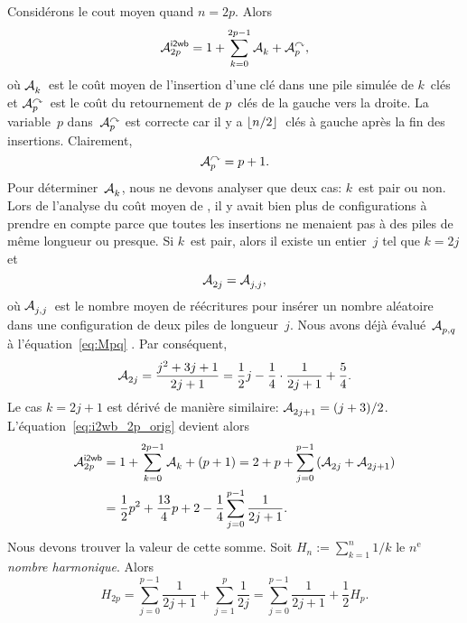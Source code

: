Considérons le cout moyen quand \(n=2p\). Alors
\begin{equation}
  \M{\fun{i2wb}}{2p} = 1 + \sum_{k=0}^{2p-1}{\M{}{k}} + \M{\curvearrowright}{p},
  \label{eq:i2wb_2p_orig}
\end{equation}
où \(\mathcal{A}_{k}^{}\)~est le coût moyen de l'insertion d'une clé dans une
pile simulée de \(k\)~clés et
\(\mathcal{A}_{p}^{\curvearrowright}\)~est
le coût du retournement de \(p\)~clés de la gauche vers la droite. La
variable~\(p\) dans~\(\mathcal{A}_{p}^{\curvearrowright}\) est correcte car il y
a \(\lfloor{n/2}\rfloor\)~clés à gauche après la fin des
insertions. Clairement,
\begin{equation*}
\mathcal{A}_{p}^{\curvearrowright} = p + 1.
\end{equation*}
Pour déterminer~\(\mathcal{A}_{k}^{}\), nous ne devons analyser que deux cas:
\(k\)~est pair ou non. Lors de l'analyse du coût moyen de ,
il y avait bien plus de configurations à prendre en compte parce que
toutes les insertions ne menaient pas à des piles de même longueur ou
presque. Si \(k\)~est pair, alors il existe un entier~\(j\) tel que
\(k=2j\) et
\begin{equation*}
\mathcal{A}_{2j}^{} = \mathcal{A}_{j,j}^{},
\end{equation*}
où \(\mathcal{A}_{j,j}^{}\)~est le nombre moyen de réécritures pour insérer un
nombre aléatoire dans une configuration de deux piles de
longueur~\(j\). Nous avons déjà évalué~\(\mathcal{A}_{p,q}^{}\) à
l'équation~\eqref{eq:Mpq} . Par conséquent,
\begin{equation*}
\mathcal{A}_{2j}^{} = \frac{j^2 + 3j + 1}{2j+1}
         = \frac{1}{2}{j} - \frac{1}{4} \cdot \frac{1}{2j+1} +
         \frac{5}{4}.
\end{equation*}
Le cas \(k=2j+1\) est dérivé de manière similaire: \(\mathcal{A}_{2j+1}^{} =
(j+3)/2\). L'équation~\eqref{eq:i2wb_2p_orig} devient alors
\begin{align}
\M{\fun{i2wb}}{2p}
  &= 1 + \sum_{k=0}^{2p-1}{\M{}{k}} + (p+1)
   = 2 + p + \sum_{j=0}^{p-1}{(\M{}{2j} + \M{}{2j+1})}\notag\\
  &= \frac{1}{2}{p^2} + \frac{13}{4}{p} + 2 -
             \frac{1}{4}\sum_{j=0}^{p-1}{\frac{1}{2j+1}}.
\label{eq:i2wb_2p}
\end{align}
Nous devons trouver la valeur de cette somme. Soit \(H_n :=
\sum_{k=1}^n{1/k}\) le \(n^\text{e}\) \emph{nombre
  harmonique}. Alors
\begin{equation*}
H_{2p} = \sum_{j=0}^{p-1}{\frac{1}{2j+1}} + \sum_{j=1}^{p}{\frac{1}{2j}}
      = \sum_{j=0}^{p-1}{\frac{1}{2j+1}} + \frac{1}{2}{H_{p}}.
\end{equation*}
